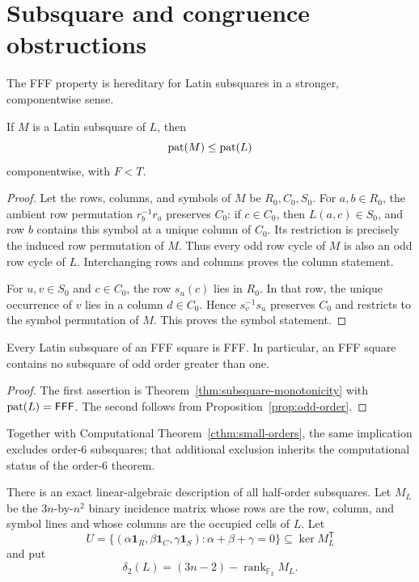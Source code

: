 \section{Subsquare and congruence obstructions}

The FFF property is hereditary for Latin subsquares in a stronger,
componentwise sense.

\begin{theorem}\label{thm:subsquare-monotonicity}
If $M$ is a Latin subsquare of $L$, then
\[
  \operatorname{pat}(M)\leq \operatorname{pat}(L)
\]
componentwise, with $F<T$.
\end{theorem}

\begin{proof}
Let the rows, columns, and symbols of $M$ be $R_0,C_0,S_0$.  For
$a,b\in R_0$, the ambient row permutation $r_b^{-1}r_a$ preserves $C_0$:
if $c\in C_0$, then $L(a,c)\in S_0$, and row $b$ contains this symbol at a
unique column of $C_0$.  Its restriction is precisely the induced row
permutation of $M$.  Thus every odd row cycle of $M$ is also an odd row
cycle of $L$.  Interchanging rows and columns proves the column statement.

For $u,v\in S_0$ and $c\in C_0$, the row $s_u(c)$ lies in $R_0$.  In that
row, the unique occurrence of $v$ lies in a column $d\in C_0$.  Hence
$s_v^{-1}s_u$ preserves $C_0$ and restricts to the symbol permutation of
$M$.  This proves the symbol statement.
\end{proof}

\begin{corollary}\label{cor:no-odd-subsquare}
Every Latin subsquare of an FFF square is FFF.  In particular, an FFF square
contains no subsquare of odd order greater than one.
\end{corollary}

\begin{proof}
The first assertion is Theorem~\ref{thm:subsquare-monotonicity} with
$\operatorname{pat}(L)=\mathsf{FFF}$.  The second follows from Proposition~\ref{prop:odd-order}.
\end{proof}

Together with Computational Theorem~\ref{cthm:small-orders}, the same implication
excludes order-$6$ subsquares; that additional exclusion inherits the
computational status of the order-$6$ theorem.

There is an exact linear-algebraic description of all half-order
subsquares.  Let $M_L$ be the $3n$-by-$n^2$ binary incidence matrix whose
rows are the row, column, and symbol lines and whose columns are the occupied
cells of $L$.  Let
\[
 U=\{(\alpha\mathbf1_R,\beta\mathbf1_C,\gamma\mathbf1_S):
       \alpha+\beta+\gamma=0\}
 \subseteq\ker M_L^{\mathsf T}
\]
and put
\[
 \delta_2(L)=(3n-2)-\operatorname{rank}_{\mathbb F_2}M_L.
\]

